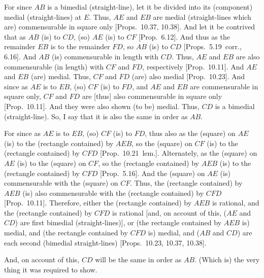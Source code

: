 \begin{Parallel}{}{}
{For since $AB$ is a bimedial (straight-line), let it be divided into its
(component) medial (straight-lines) at $E$. Thus, $AE$ and $EB$
are medial (straight-lines which are) commensurable in square only [Props.~10.37, 10.38]. And
let it be contrived that as $AB$ (is) to $CD$, (so) $AE$ (is)
to $CF$ [Prop.~6.12]. And thus as the remainder $EB$ is to the remainder $FD$, so $AB$ (is) to $CD$ [Props.~5.19~corr., 6.16].
And $AB$ (is) commensurable in length with $CD$. Thus, $AE$
and $EB$ are also commensurable (in length) with $CF$ and $FD$, respectively [Prop.~10.11]. And 
$AE$ and $EB$ (are) medial. Thus, $CF$ and $FD$ (are) also
medial [Prop.~10.23]. And since as $AE$
is to $EB$, (so) $CF$ (is) to $FD$, and $AE$ and $EB$ are commensurable
in square only, $CF$ and $FD$ are [thus] also commensurable in square only
[Prop.~10.11]. And they were also shown (to be)
medial. Thus, $CD$ is a bimedial (straight-line). So, I say that it is also the same in order as $AB$.

For since as $AE$ is to $EB$, (so) $CF$ (is) to $FD$, thus also as the
(square) on $AE$ (is) to the (rectangle contained) by $AEB$, so the (square)
on $CF$ (is) to the (rectangle contained) by $CFD$ [Prop.~10.21~lem.]. Alternately, as the (square)
on $AE$ (is) to the (square) on $CF$, so the (rectangle
contained) by $AEB$ (is) to the (rectangle contained) by $CFD$ [Prop.~5.16]. And the (square) on $AE$
(is) commensurable with the (square) on $CF$. Thus, the (rectangle
contained) by $AEB$ (is) also commensurable with the (rectangle contained)
by $CFD$ [Prop.~10.11]. Therefore,  either the
(rectangle contained) by $AEB$ is rational, and  the (rectangle contained) by
$CFD$ is rational [and, on account of this, ($AE$ and $CD$) are first
bimedial (straight-lines)], or (the rectangle contained by $AEB$ is) medial,
and (the rectangle contained by $CFD$ is) medial, and ($AB$ and
$CD$) are each second (bimedial straight-lines) [Props.~10.23, 10.37, 10.38].

And, on account of this, $CD$ will be  the same in order as $AB$.
(Which is) the very thing it was required to show.}
\end{Parallel}

